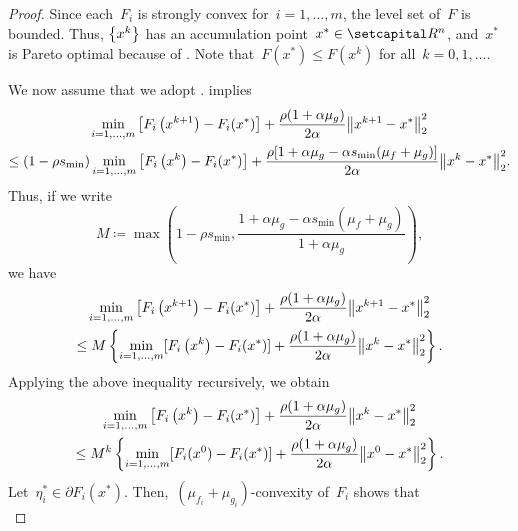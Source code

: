 \documentclass[../../main]{subfiles}
\begin{document}
\begin{proof}
    Since each~$F_i$ is strongly convex for~$i = 1, \dots, m$, the level set of~$F$ is bounded.
    Thus, $\set*{x^k}$ has an accumulation point~$x^* \in \setR^n$, and~$x^*$ is Pareto optimal because of .
    Note that~$F(x^*) \le F\left(x^k\right)$ for all~$k = 0, 1, \dots$.

    We now assume that we adopt .
     implies
    \begin{multline}
        \min_{i = 1, \dots, m} \left[F_i\left(x^{k + 1}\right) - F_i(x^*)\right] + \frac{\rho (1 + \alpha \mu_g)}{2 \alpha} \norm*{x^{k + 1} - x^*}_2^2 \\
        \le (1 - \rho s_{\min}) \min_{i = 1, \dots, m} \left[F_i\left(x^k\right) - F_i(x^*)\right] + \frac{\rho [1 + \alpha \mu_g - \alpha s_{\min} (\mu_f + \mu_g)]}{2 \alpha} \norm*{x^k - x^*}_2^2
    .\end{multline}
    Thus, if we write
    \begin{equation}
        M \coloneqq \max \left( 1 - \rho s_{\min}, \frac{1 + \alpha \mu_g - \alpha s_{\min} (\mu_f + \mu_g)}{1 + \alpha \mu_g} \right) 
    ,\end{equation}
    we have
    \begin{multline}
        \min_{i = 1, \dots, m} \left[F_i\left(x^{k + 1}\right) - F_i(x^*)\right] + \frac{\rho (1 + \alpha \mu_g)}{2 \alpha} \norm*{x^{k + 1} - x^*}_2^2 \\
        \le M \left\{ \min_{i = 1, \dots, m} [F_i\left(x^k\right) - F_i(x^*)] + \frac{\rho (1 + \alpha \mu_g)}{2 \alpha} \norm*{x^k - x^*}_2^2 \right\}  
    .\end{multline}
    Applying the above inequality recursively, we obtain
    \begin{multline} \label{eq:pgm_linear_convergence_sc:rec}
        \min_{i = 1, \dots, m} \left[F_i\left(x^k\right) - F_i(x^*)\right] + \frac{\rho (1 + \alpha \mu_g)}{2 \alpha} \norm*{x^k - x^*}_2^2 \\
        \le M^k \left\{ \min_{i = 1, \dots, m} [F_i(x^0) - F_i(x^*)] + \frac{\rho (1 + \alpha \mu_g)}{2 \alpha} \norm*{x^0 - x^*}_2^2 \right\}  
    .\end{multline}
    Let~$\eta_i^* \in \partial F_i(x^*)$.
    Then,~$(\mu_{f_i} + \mu_{g_i})$-convexity of~$F_i$ shows that
    \begin{equation} \label{eq:pgm_linear_convergence_sc:sc}

\end{equation}
\end{proof}
\end{document}
